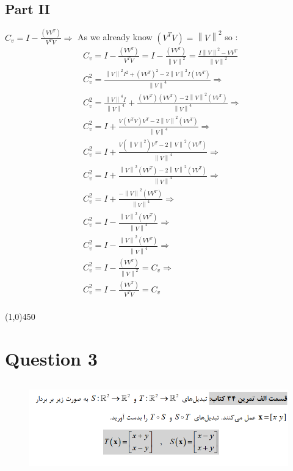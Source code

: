 \documentclass[a4paper,12pt]{article}
\begin{document}
\newcommand\norm[1]{\left\lVert#1\right\rVert}
\newcommand\normV[1]{\norm{V}^#1}
\subsection{Part II}
$C_v = I - \frac{(VV^T)}{V^TV} \Rightarrow$  As we already know $ (V^TV)   = \norm{V}^2$ so : \\
	\begin{align*}	
	&C_v = I - \frac{(VV^T)}{V^TV} = I - \frac{(VV^T)}{\normV{2}} = \frac{I\normV{2} - VV^T}{\normV{2}}\\
	&C_v^2 = \frac{\normV{2}I^2 + (VV^T)^2 - 2\normV{2}I(VV^T)}{\normV{4}} \Rightarrow \\
	&C_v^2 =\frac{\normV{4}I }{\normV{4}} +  \frac{ (VV^T)(VV^T) - 2\normV{2}(VV^T) }{\normV{4}} \Rightarrow \\
	&C_v^2 = I  +  \frac{ V(V^TV)V^T - 2\normV{2}(VV^T) }{\normV{4}} \Rightarrow \\
	&C_v^2 = I  +  \frac{ V(\normV{2})V^T - 2\normV{2}(VV^T) }{\normV{4}} \Rightarrow \\
	&C_v^2 = I  +  \frac{ \normV{2}(VV^T) - 2\normV{2}(VV^T) }{\normV{4}} \Rightarrow \\
	&C_v^2 = I  +  \frac{- \normV{2}(VV^T) }{\normV{4}} \Rightarrow \\
	&C_v^2 = I  -  \frac{\normV{2}(VV^T) }{\normV{4}} \Rightarrow \\
	&C_v^2 = I  -  \frac{\normV{2}(VV^T) }{\normV{4}} \Rightarrow \\
	&C_v^2 = I  -  \frac{(VV^T) }{\normV{2}}  = C_v \Rightarrow \\
	&C_v^2   = I - \frac{(VV^T)}{V^TV} = C_v \\
	\end{align*}


\line(1,0){450}
\newpage

\section {Question 3 }
\begin{figure}[h!]
	\centering
	\includegraphics*[height=4cm]{Q3}
\end{figure}
\end{document}
